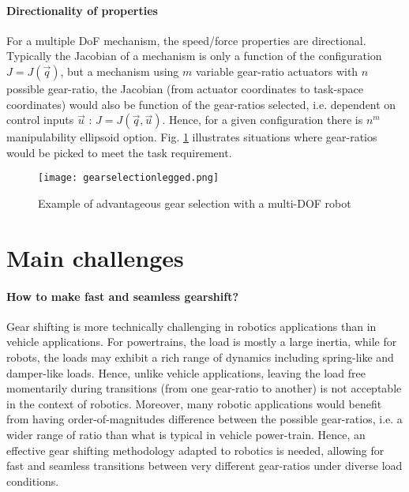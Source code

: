 \paragraph{Directionality of properties}
For a multiple DoF mechanism, the speed/force properties are directional. Typically the Jacobian of a mechanism is only a function of the configuration $J=J(\vec{q})$, but a mechanism using $m$ variable gear-ratio actuators with $n$ possible gear-ratio, the Jacobian (from actuator coordinates to task-space coordinates) would also be function of the gear-ratios selected, i.e. dependent on control inputs $\vec{u}$ : $J=J(\vec{q},\vec{u})$. Hence, for a given configuration there is $n^m$ manipulability ellipsoid option. Fig. \ref{fig:gearselectionlegged} illustrates situations where gear-ratios would be picked to meet the task requirement.


\begin{figure}[H]
	\centering
		\texttt{[image: gearselectionlegged.png]}
	\caption{Example of advantageous gear selection with a multi-DOF robot}
	\label{fig:gearselectionlegged}
\end{figure}


\section{Main challenges}
\label{sec:MainChallenges}

\paragraph{How to make fast and seamless gearshift?}
Gear shifting is more technically challenging in robotics applications than in vehicle applications. For powertrains, the load is mostly a large inertia, while for robots, the loads may exhibit a rich range of dynamics including spring-like and damper-like loads. Hence, unlike vehicle applications, leaving the load free momentarily during transitions (from one gear-ratio to another) is not acceptable in the context of robotics. Moreover, many robotic applications would benefit from having order-of-magnitudes difference between the possible gear-ratios, i.e. a wider range of ratio than what is typical in vehicle power-train. Hence, an effective gear shifting methodology adapted to robotics is needed, allowing for fast and seamless transitions between very different gear-ratios under diverse load conditions.

